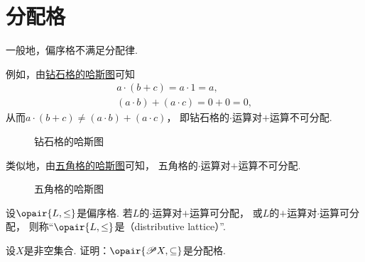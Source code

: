 \section{分配格}
一般地，偏序格不满足分配律.

例如，由\hyperref[figure:格论.偏序集2]{钻石格的哈斯图}可知\begin{gather*}
	a \cdot (b + c) = a \cdot 1 = a, \\
	(a \cdot b) + (a \cdot c) = 0 + 0 = 0,
\end{gather*}
从而\(a \cdot (b + c) \neq (a \cdot b) + (a \cdot c)\)，
即钻石格的\(\cdot\)运算对\(+\)运算不可分配.

\begin{figure}[hbt]
	\centering
	\caption{钻石格的哈斯图}
	\label{figure:格论.偏序集2}
\end{figure}

类似地，由\hyperref[figure:格论.偏序集3]{五角格的哈斯图}可知，
五角格的\(\cdot\)运算对\(+\)运算不可分配.

\begin{figure}[hbt]
	\centering
	\caption{五角格的哈斯图}
	\label{figure:格论.偏序集3}
\end{figure}

\begin{definition}
设\(\opair{L,\leq}\)是偏序格.
若\(L\)的\(\cdot\)运算对\(+\)运算可分配，
或\(L\)的\(+\)运算对\(\cdot\)运算可分配，
则称“\(\opair{L,\leq}\)是（distributive lattice）”.
\end{definition}

\begin{example}
设\(X\)是非空集合.
证明：\(\opair{\Powerset X,\subseteq}\)是分配格.
\end{example}
